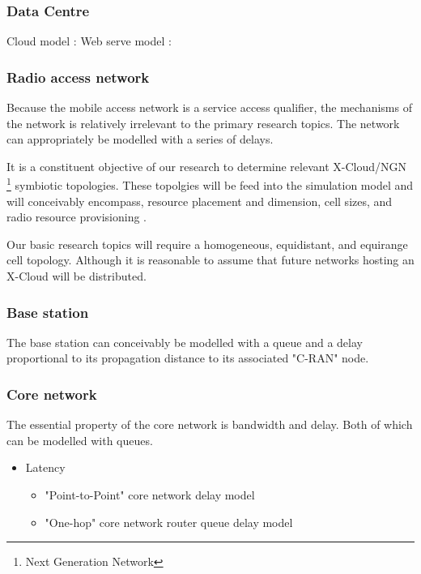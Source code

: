 \subsubsection{Data Centre}
Cloud model : \cite{5959161}
Web serve model : \cite{1191656}

\subsubsection{Radio access network}
Because the mobile access network is a service access qualifier, the mechanisms of the network is relatively irrelevant to the primary research topics. The network can appropriately be modelled with a series of delays. 

It is a constituent objective of our research to determine relevant X-Cloud/NGN \footnote{Next Generation Network} symbiotic topologies. These topolgies will be feed into the simulation model and will conceivably encompass, resource placement and dimension, cell sizes, and radio resource provisioning \cite{kwan2010mobility,racz2007handover,salo2010practical}.

Our basic research topics will require a homogeneous, equidistant, and equirange cell topology. Although it is reasonable to assume that future networks hosting an X-Cloud will be distributed. 

\subsubsection{Base station}
The base station can conceivably be modelled with a queue and a delay proportional to its propagation distance to its associated "C-RAN" node.

\subsubsection{Core network}
The essential property of the core network is bandwidth and delay. Both of which can be modelled with queues.

\begin{itemize}
\item Latency
\begin{itemize}
\item "Point-to-Point" core network delay model \cite{choi2007analysis}
\item "One-hop" core network router queue delay model  \cite{papagiannaki2003measurement}
\end{itemize}
\end{itemize}

